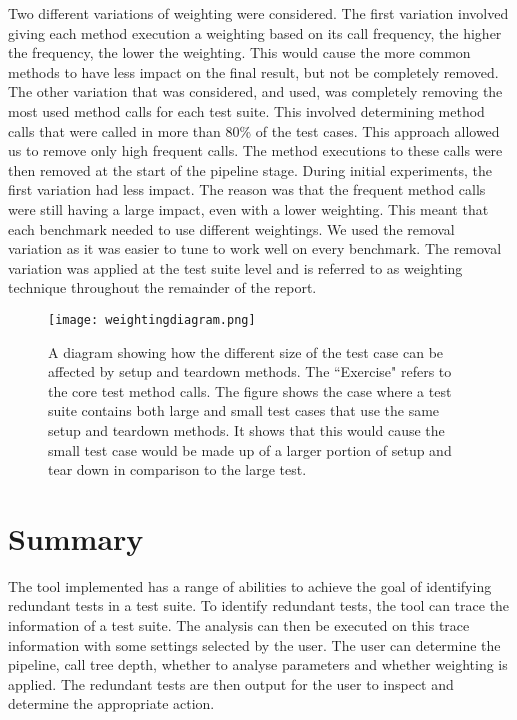 Two different variations of weighting were considered. The first variation involved giving each method execution a weighting based on its call frequency, the higher the frequency, the lower the weighting. This would cause the more common methods to have less impact on the final result, but not be completely removed. The other variation that was considered, and used, was completely removing the most used method calls for each test suite. This involved determining method calls that were called in more than 80\% of the test cases. This approach allowed us to remove only high frequent calls. The method executions to these calls were then removed at the start of the pipeline stage. During initial experiments, the first variation had less impact. The reason was that the frequent method calls were still having a large impact, even with a lower weighting. This meant that each benchmark needed to use different weightings. We used the removal variation as it was easier to tune to work well on every benchmark. The removal variation was applied at the test suite level and is referred to as weighting technique throughout the remainder of the report.

\begin{figure}[h]
\texttt{[image: weightingdiagram.png]}
\caption[How the weighting technique affects test cases differently]{A diagram showing how the different size of the test case can be affected by setup and teardown methods. The ``Exercise" refers to the core test method calls. The figure shows the case where a test suite contains both large and small test cases that use the same setup and teardown methods. It shows that this would cause the small test case would be made up of a larger portion of setup and tear down in comparison to the large test.}
\label{fig:weightingdiagram}
\end{figure}

\section{Summary}

The tool implemented has a range of abilities to achieve the goal of identifying redundant tests in a test suite. To identify redundant tests, the tool can trace the information of a test suite. The analysis can then be executed on this trace information with some settings selected by the user. The user can determine the pipeline, call tree depth, whether to analyse parameters and whether weighting is applied. The redundant tests are then output for the user to inspect and determine the appropriate action. 